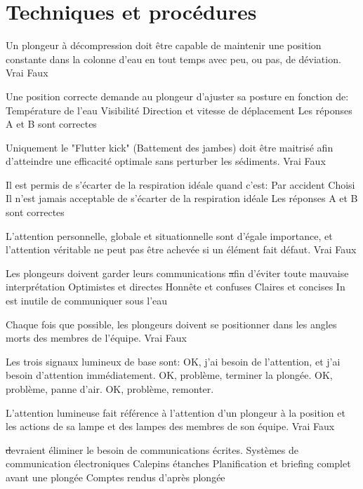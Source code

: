 \documentclass[english,10pt,a4paper,twoside]{article}
\begin{document}
	\vfill
	\pagebreak

	\section{Techniques et procédures}
	\begin{outline}
		\1 Un plongeur à décompression doit être capable de maintenir une position constante dans la colonne d'eau en tout temps avec peu, ou pas, de déviation.
			\2 Vrai
			\2 Faux

		\1 Une position correcte demande au plongeur d'ajuster sa posture en fonction de:
			\2 Température de l'eau
			\2 Visibilité
			\2 Direction et vitesse de déplacement
			\2 Les réponses A et B sont correctes

		\1 Uniquement le "Flutter kick" (Battement des jambes) doit être maitrisé afin d'atteindre une efficacité optimale sans perturber les sédiments.
			\2 Vrai
			\2 Faux

		\1 Il est permis de s'écarter de la respiration idéale quand c'est:
			\2 Par accident
			\2 Choisi
			\2 Il n'est jamais acceptable de s'écarter de la respiration idéale
			\2 Les réponses A et B sont correctes

		\1 L'attention personnelle, globale et situationnelle sont d'égale importance, et l'attention véritable ne peut pas être achevée si un élément fait défaut.
			\2 Vrai
			\2 Faux

		\1 Les plongeurs doivent garder leurs communications \st afin d'éviter toute mauvaise interprétation
			\2 Optimistes et directes
			\2 Honnête et confuses
			\2 Claires et concises
			\2 In est inutile de communiquer sous l'eau

		\1 Chaque fois que possible, les plongeurs doivent se positionner dans les angles morts des membres de l'équipe.
			\2 Vrai
			\2 Faux

		\1 Les trois signaux lumineux de base sont:
			\2 OK, j'ai besoin de l'attention, et j'ai besoin d'attention immédiatement.
			\2 OK, problème, terminer la plongée.
			\2 OK, problème, panne d'air.
			\2 OK, problème, remonter.

		\1 L'attention lumineuse fait référence à l'attention d'un plongeur à la position et les actions de sa lampe et des lampes des membres de son équipe.
			\2 Vrai
			\2 Faux

		\1 \st devraient éliminer le besoin de communications écrites.
			\2 Systèmes de communication électroniques
			\2 Calepins étanches
			\2 Planification et briefing complet avant une plongée
			\2 Comptes rendus d'après plongée


\end{outline}
\end{document}
